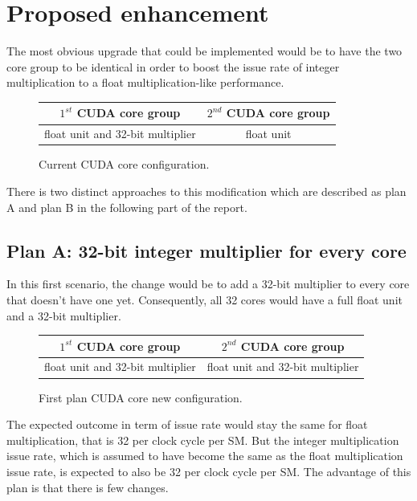 \documentclass{report}
\begin{document}
   \section{Proposed enhancement}
   The most obvious upgrade that could be implemented would be to have the two core group to be identical in order to boost the issue rate of integer multiplication to a float multiplication-like performance.
   \begin{figure}[H]
      \centering
       \begin{tabular}{ | c | c | }
    	    \hline
    	    $1^{st}$ CUDA core group & $2^{nd}$ CUDA core group \\ \hline
    	   float unit and 32-bit multiplier & float unit \\ \hline
  	\end{tabular}
  	\captionsetup{justification=centering}
  	\caption{Current CUDA core configuration.}
  	\label{fig:current_cores}
   \end{figure}
   There is two distinct approaches to this modification which are described as plan A and plan B in the following part of the report.
   \subsection{Plan A: 32-bit integer multiplier for every core}
    In this first scenario, the change would be to add a 32-bit multiplier to every core that doesn't have one yet. Consequently, all 32 cores would have a full float unit and a 32-bit multiplier.
    \begin{figure}[H]
      \centering
       \begin{tabular}{ | c | c | }
    	    \hline
    	    $1^{st}$ CUDA core group & $2^{nd}$ CUDA core group \\ \hline
    	   float unit and 32-bit multiplier & float unit and 32-bit multiplier \\ \hline
  	\end{tabular}
  	\captionsetup{justification=centering}
  	\caption{First plan CUDA core new configuration.}
  	\label{fig:planA_cores}
   \end{figure}
    The expected outcome in term of issue rate would stay the same for float multiplication, that is 32 per clock cycle per SM. But the integer multiplication issue rate, which is assumed to have become the same as the float multiplication issue rate, is expected to also be 32 per clock cycle per SM.
    The advantage of this plan is that there is few changes.
\end{document}
